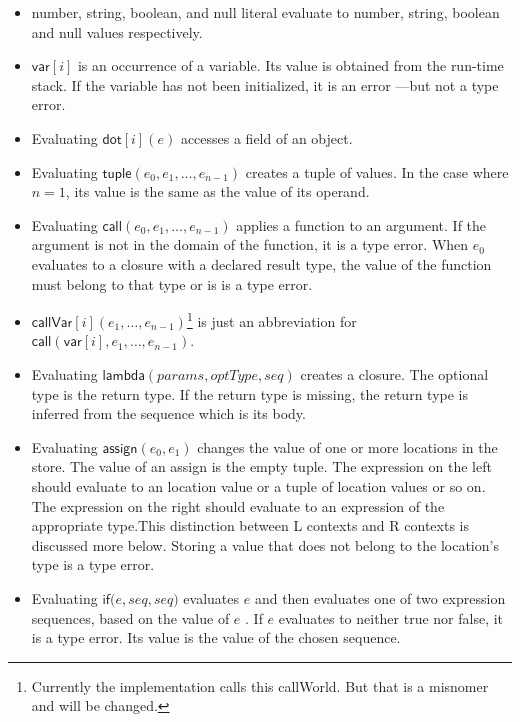 \documentclass[12pt]{article}
\begin{document}
\begin{itemize}
\item number, string, boolean, and null literal evaluate to number, string,
boolean and null values respectively.

\item $\mathsf{var}[i]$ is an occurrence of a variable. Its value is
obtained from the run-time stack. If the variable has not been initialized,
it is an error ---but not a type error.

\item Evaluating $\mathsf{dot}\left[ i\right] (e)$ accesses a field of an
object.

\item Evaluating $\mathsf{tuple}\left( e_{0},e_{1},\ldots ,e_{n-1}\right) $
creates a tuple of values. In the case where $n=1$, its value is the same as
the value of its operand.

\item Evaluating $\mathsf{call}(e_{0},e_{1},\ldots ,e_{n-1})$ applies a
function to an argument. If the argument is not in the domain of the
function, it is a type error. When $e_{0}$ evaluates to a closure with a
declared result type, the value of the function must belong to that type or
is is a type error.

\item $\mathsf{callVar}[i](e_{1},\ldots ,e_{n-1})$\footnote{%
Currently the implementation calls this callWorld. But that is a misnomer
and will be changed.} is just an abbreviation for $\mathsf{call}(\mathsf{var}%
[i],e_{1},\ldots ,e_{n-1})$.

\item Evaluating $\mathsf{lambda}(\mathit{params},\mathit{optType,seq})$
creates a closure. The optional type is the return type. If the return type
is missing, the return type is inferred from the sequence which is its body.

\item Evaluating $\mathsf{assign}(e_{0},e_{1})$ changes the value of one or
more locations in the store. The value of an assign is the empty tuple. The
expression on the left should evaluate to an location value or a tuple of
location values or so on. The expression on the right should evaluate to an
expression of the appropriate type.This distinction between L contexts and R
contexts is discussed more below. Storing a value that does not belong to
the location's type is a type error.

\item Evaluating $\mathsf{if}(e,\mathit{seq},\mathit{seq)}$ evaluates $e$
and then evaluates one of two expression sequences, based on the value of $e$%
. If $e$ evaluates to neither true nor false, it is a type error. Its value
is the value of the chosen sequence.


\end{itemize}
\end{document}
